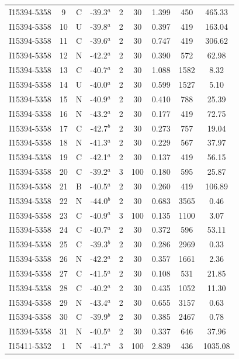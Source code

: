 \begin{table}
\begin{tabular}{ccccccccc}
I15394-5358 & 9 & C & -39.3$^{a}$ & 2 & 30 & 1.399 & 450 & 465.33 \\
I15394-5358 & 10 & U & -39.8$^{a}$ & 2 & 30 & 0.397 & 419 & 163.04 \\
I15394-5358 & 11 & C & -39.6$^{a}$ & 2 & 30 & 0.747 & 419 & 306.62 \\
I15394-5358 & 12 & N & -42.2$^{a}$ & 2 & 30 & 0.390 & 572 & 62.98 \\
I15394-5358 & 13 & C & -40.7$^{a}$ & 2 & 30 & 1.088 & 1582 & 8.32 \\
I15394-5358 & 14 & U & -40.0$^{a}$ & 2 & 30 & 0.599 & 1527 & 5.10 \\
I15394-5358 & 15 & N & -40.9$^{a}$ & 2 & 30 & 0.410 & 788 & 25.39 \\
I15394-5358 & 16 & N & -43.2$^{a}$ & 2 & 30 & 0.177 & 419 & 72.75 \\
I15394-5358 & 17 & C & -42.7$^{b}$ & 2 & 30 & 0.273 & 757 & 19.04 \\
I15394-5358 & 18 & N & -41.3$^{a}$ & 2 & 30 & 0.229 & 567 & 37.97 \\
I15394-5358 & 19 & C & -42.1$^{a}$ & 2 & 30 & 0.137 & 419 & 56.15 \\
I15394-5358 & 20 & C & -39.2$^{a}$ & 3 & 100 & 0.180 & 595 & 25.87 \\
I15394-5358 & 21 & B & -40.5$^{a}$ & 2 & 30 & 0.260 & 419 & 106.89 \\
I15394-5358 & 22 & N & -44.0$^{b}$ & 2 & 30 & 0.683 & 3565 & 0.46 \\
I15394-5358 & 23 & C & -40.9$^{a}$ & 3 & 100 & 0.135 & 1100 & 3.07 \\
I15394-5358 & 24 & C & -40.7$^{a}$ & 2 & 30 & 0.372 & 596 & 53.11 \\
I15394-5358 & 25 & C & -39.3$^{b}$ & 2 & 30 & 0.286 & 2969 & 0.33 \\
I15394-5358 & 26 & N & -42.2$^{a}$ & 2 & 30 & 0.357 & 1661 & 2.36 \\
I15394-5358 & 27 & C & -41.5$^{a}$ & 2 & 30 & 0.108 & 531 & 21.85 \\
I15394-5358 & 28 & C & -40.2$^{a}$ & 2 & 30 & 0.435 & 1052 & 11.30 \\
I15394-5358 & 29 & N & -43.4$^{a}$ & 2 & 30 & 0.655 & 3157 & 0.63 \\
I15394-5358 & 30 & C & -39.9$^{b}$ & 2 & 30 & 0.385 & 2467 & 0.78 \\
I15394-5358 & 31 & N & -40.5$^{a}$ & 2 & 30 & 0.337 & 646 & 37.96 \\
I15411-5352 & 1 & N & -41.7$^{a}$ & 3 & 100 & 2.839 & 436 & 1035.08 \\

\end{tabular}
\end{table}
